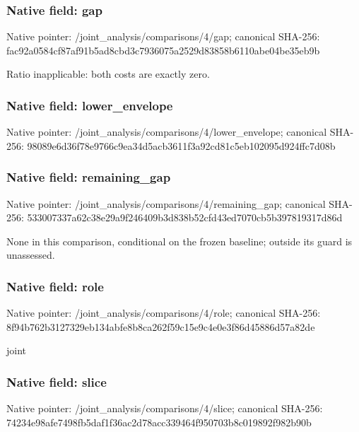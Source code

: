 \documentclass[10pt,a4paper]{article}
\begin{document}
\subsubsection{Native field: gap}
Native pointer: /joint\_\allowbreak{}analysis/comparisons/4/gap; canonical SHA-256: fac92a0584cf87af91b5ad8cbd3c7936075a2529d83858b6110abe04be35eb9b

\begingroup\raggedright\sloppy Ratio inapplicable:\allowbreak{} both costs are exactly zero.\par\endgroup

\subsubsection{Native field: lower\_\allowbreak{}envelope}
Native pointer: /joint\_\allowbreak{}analysis/comparisons/4/lower\_\allowbreak{}envelope; canonical SHA-256: 98089e6d36f78e9766c9ea34d5acb3611f3a92cd81c5eb102095d924ffc7d08b

\begingroup\raggedright{}\par\endgroup

\subsubsection{Native field: remaining\_\allowbreak{}gap}
Native pointer: /joint\_\allowbreak{}analysis/comparisons/4/remaining\_\allowbreak{}gap; canonical SHA-256: 533007337a62c38e29a9f246409b3d838b52cfd43ed7070cb5b397819317d86d

\begingroup\raggedright\sloppy None in this comparison,\allowbreak{} conditional on the frozen baseline;\allowbreak{} outside its guard is unassessed.\par\endgroup

\subsubsection{Native field: role}
Native pointer: /joint\_\allowbreak{}analysis/comparisons/4/role; canonical SHA-256: 8f94b762b3127329eb134abfe8b8ca262f59c15e9c4e0e3f86d45886d57a82de

\begingroup\raggedright\sloppy joint\par\endgroup

\subsubsection{Native field: slice}
Native pointer: /joint\_\allowbreak{}analysis/comparisons/4/slice; canonical SHA-256: 74234e98afe7498fb5daf1f36ac2d78acc339464f950703b8c019892f982b90b
\end{document}
